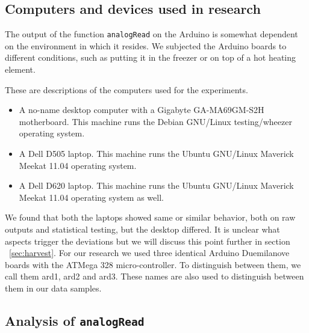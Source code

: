 \documentclass[a4paper]{article}           %
\begin{document}
\subsection{Computers and devices used in research}

The output of the function \texttt{analogRead} on the Arduino is somewhat dependent on the environment in which it resides. We subjected the Arduino boards to different conditions, such as putting it in the freezer or on top of a hot heating element. 

These are descriptions of the computers used for the experiments. 


\begin{itemize}
\item A no-name desktop computer with a Gigabyte GA-MA69GM-S2H motherboard. This machine runs the Debian GNU/Linux testing/wheezer operating system.
\item A Dell D505 laptop. This machine runs the Ubuntu GNU/Linux Maverick Meekat 11.04 operating system.
\item A Dell D620 laptop. This machine runs the Ubuntu GNU/Linux Maverick Meekat 11.04 operating system as well.
\end{itemize}

We found that both the laptops showed same or similar behavior, both on raw outputs and statistical testing, but the desktop differed. It is unclear what aspects trigger the deviations but we will discuss this point further in section ~\ref{sec:harvest}. For our research we used three identical Arduino Duemilanove boards with the ATMega 328 micro-controller. To distinguish between them, we call them ard1, ard2 and ard3. These names are also used to distinguish between them in our data samples. 

\subsection{Analysis of \texttt{analogRead}}
\end{document}
